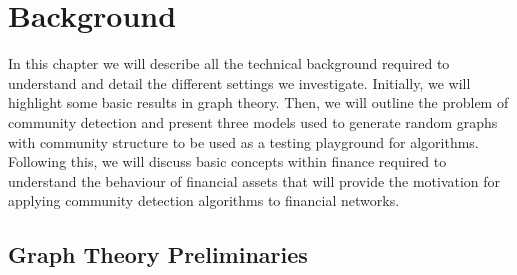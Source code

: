 
\chapter{Background}

\label{cha:background}


In this chapter we will describe all the technical background required to understand and detail the different settings we investigate.
Initially, we will highlight some basic results in graph theory.
Then, we will outline the problem of community detection and present three models used to generate random graphs with community structure to be used as a testing playground for algorithms.
Following this, we will discuss basic concepts within finance required to understand the behaviour of financial assets that will provide the motivation for applying community detection algorithms to financial networks.


\section{Graph Theory Preliminaries}
\label{sec:graphTheoryBackground}

